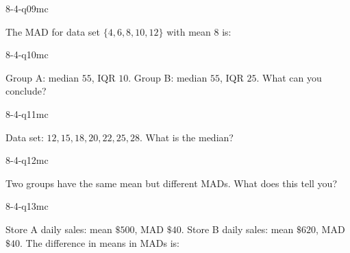 \begin{practiceQuestion}{8-4-q09}{mc}
\begin{questionText}
The MAD for data set $\{4, 6, 8, 10, 12\}$ with mean $8$ is:
\end{questionText}
\end{practiceQuestion}

\begin{practiceQuestion}{8-4-q10}{mc}
\begin{questionText}
Group A: median $55$, IQR $10$. Group B: median $55$, IQR $25$. What can you conclude?
\end{questionText}
\end{practiceQuestion}

\begin{practiceQuestion}{8-4-q11}{mc}
\begin{questionText}
Data set: $12, 15, 18, 20, 22, 25, 28$. What is the median?
\end{questionText}
\end{practiceQuestion}

\begin{practiceQuestion}{8-4-q12}{mc}
\begin{questionText}
Two groups have the same mean but different MADs. What does this tell you?
\end{questionText}
\end{practiceQuestion}

\begin{practiceQuestion}{8-4-q13}{mc}
\begin{questionText}
Store A daily sales: mean $\$500$, MAD $\$40$. Store B daily sales: mean $\$620$, MAD $\$40$. The difference in means in MADs is:
\end{questionText}
\end{practiceQuestion}

